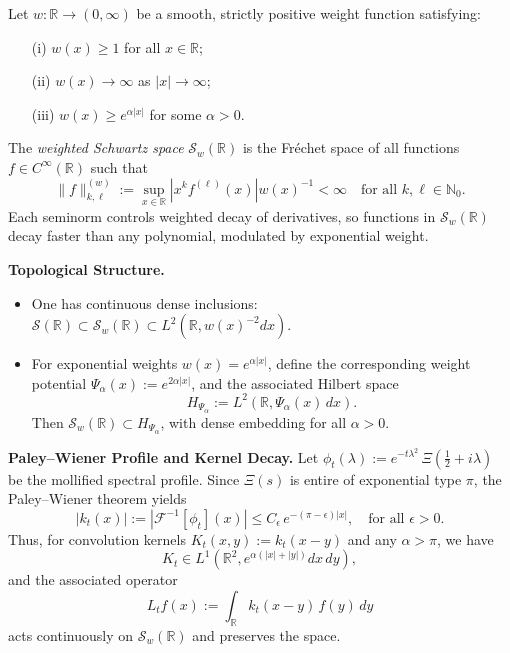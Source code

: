 \begin{definition}\label{def:weighted_schwartz_space}
Let \( w \colon \mathbb{R} \to (0, \infty) \) be a smooth, strictly positive weight function satisfying:
\begin{enumerate}
    \item[\textup{(i)}] \( w(x) \ge 1 \) for all \( x \in \mathbb{R} \);
    \item[\textup{(ii)}] \( w(x) \to \infty \) as \( |x| \to \infty \);
    \item[\textup{(iii)}] \( w(x) \ge e^{\alpha |x|} \) for some \( \alpha > 0 \).
\end{enumerate}

The \emph{weighted Schwartz space} \( \mathcal{S}_w(\mathbb{R}) \) is the Fréchet space of all functions \( f \in C^\infty(\mathbb{R}) \) such that
\[
\| f \|^{(w)}_{k,\ell} := \sup_{x \in \mathbb{R}} \left| x^k f^{(\ell)}(x) \right| w(x)^{-1} < \infty \quad \text{for all } k,\ell \in \mathbb{N}_0.
\]
Each seminorm controls weighted decay of derivatives, so functions in \( \mathcal{S}_w(\mathbb{R}) \) decay faster than any polynomial, modulated by exponential weight.

\medskip
\noindent\textbf{Topological Structure.}
\begin{itemize}
    \item One has continuous dense inclusions: \( \mathcal{S}(\mathbb{R}) \subset \mathcal{S}_w(\mathbb{R}) \subset L^2(\mathbb{R}, w(x)^{-2} dx) \).

    \item For exponential weights \( w(x) = e^{\alpha |x|} \), define the corresponding weight potential \( \Psi_\alpha(x) := e^{2\alpha |x|} \), and the associated Hilbert space
    \[
    H_{\Psi_\alpha} := L^2(\mathbb{R}, \Psi_\alpha(x)\, dx).
    \]
    Then \( \mathcal{S}_w(\mathbb{R}) \subset H_{\Psi_\alpha} \), with dense embedding for all \( \alpha > 0 \).
\end{itemize}

\medskip
\noindent\textbf{Paley–Wiener Profile and Kernel Decay.}
Let \( \phi_t(\lambda) := e^{-t\lambda^2} \, \Xi\left( \tfrac{1}{2} + i\lambda \right) \) be the mollified spectral profile. Since \( \Xi(s) \) is entire of exponential type \( \pi \), the Paley–Wiener theorem yields
\[
|k_t(x)| := \left| \mathcal{F}^{-1}[\phi_t](x) \right| \le C_\epsilon \, e^{-(\pi - \epsilon)|x|}, \quad \text{for all } \epsilon > 0.
\]
Thus, for convolution kernels \( K_t(x,y) := k_t(x - y) \) and any \( \alpha > \pi \), we have
\[
K_t \in L^1(\mathbb{R}^2, e^{\alpha(|x| + |y|)} dx\,dy),
\]
and the associated operator
\[
L_t f(x) := \int_{\mathbb{R}} k_t(x - y)\, f(y)\, dy
\]
acts continuously on \( \mathcal{S}_w(\mathbb{R}) \) and preserves the space.


\end{definition}
